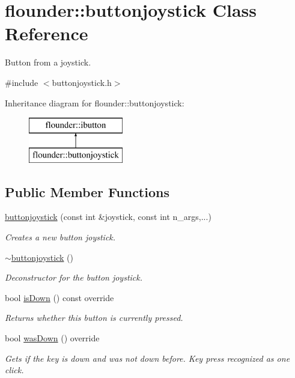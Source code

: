 \hypertarget{classflounder_1_1buttonjoystick}{}\section{flounder\+:\+:buttonjoystick Class Reference}
\label{classflounder_1_1buttonjoystick}


Button from a joystick.  




{\ttfamily \#include $<$buttonjoystick.\+h$>$}

Inheritance diagram for flounder\+:\+:buttonjoystick\+:\begin{figure}[H]
\begin{center}
\leavevmode
\includegraphics[height=2.000000cm]{classflounder_1_1buttonjoystick}
\end{center}
\end{figure}
\subsection*{Public Member Functions}
\begin{DoxyCompactItemize}
\item 
\hyperlink{classflounder_1_1buttonjoystick_a1b31996ff3588c033e85839aef2d35c8}{buttonjoystick} (const int \&joystick, const int n\+\_\+args,...)
\begin{DoxyCompactList}\small\item\em Creates a new button joystick. \end{DoxyCompactList}\item 
\hyperlink{classflounder_1_1buttonjoystick_aece2e8931c528cef0a266f17b2eba88b}{$\sim$buttonjoystick} ()
\begin{DoxyCompactList}\small\item\em Deconstructor for the button joystick. \end{DoxyCompactList}\item 
bool \hyperlink{classflounder_1_1buttonjoystick_adf53e97310b757108a417f5d4e6c5ab0}{is\+Down} () const override
\begin{DoxyCompactList}\small\item\em Returns whether this button is currently pressed. \end{DoxyCompactList}\item 
bool \hyperlink{classflounder_1_1buttonjoystick_a99302b1345fa773ec839290ae6c406e7}{was\+Down} () override
\begin{DoxyCompactList}\small\item\em Gets if the key is down and was not down before. Key press recognized as one click. \end{DoxyCompactList}\end{DoxyCompactItemize}
